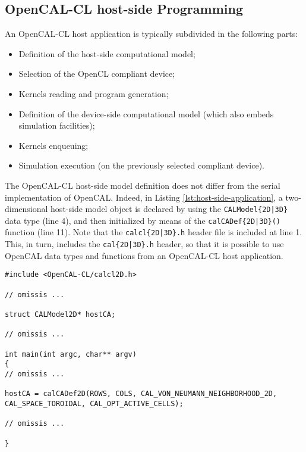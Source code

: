 \subsection{OpenCAL-CL host-side Programming}
An OpenCAL-CL host application is typically subdivided in the
following parts:
\begin{itemize}
	\item Definition of the host-side computational model;
	\item Selection of the OpenCL compliant device;
	\item Kernels reading and program generation;
	\item Definition of the device-side computational model (which
	also embeds simulation facilities);
	\item Kernels enqueuing;
	\item Simulation execution (on the previously selected compliant
	device).
\end{itemize}

The OpenCAL-CL host-side model definition does not differ from the
serial implementation of OpenCAL. Indeed, in Listing
\ref{lst:host-side-application}, a two-dimensional host-side model
object is declared by using the \verb'CALModel{2D|3D}' data type
(line 4), and then initialized by means of the
\verb'calCADef{2D|3D}()' function (line 11). Note that the
\verb'calcl{2D|3D}.h' header file is included at line 1. This, in
turn, includes the \verb'cal{2D|3D}.h' header, so that it is
possible to use OpenCAL data types and functions from an
OpenCAL-CL host application.

\begin{lstlisting}
#include <OpenCAL-CL/calcl2D.h>

// omissis ...

struct CALModel2D* hostCA;

// omissis ...

int main(int argc, char** argv)
{
// omissis ...

hostCA = calCADef2D(ROWS, COLS, CAL_VON_NEUMANN_NEIGHBORHOOD_2D, CAL_SPACE_TOROIDAL, CAL_OPT_ACTIVE_CELLS);

// omissis ...

}
\end{lstlisting}

